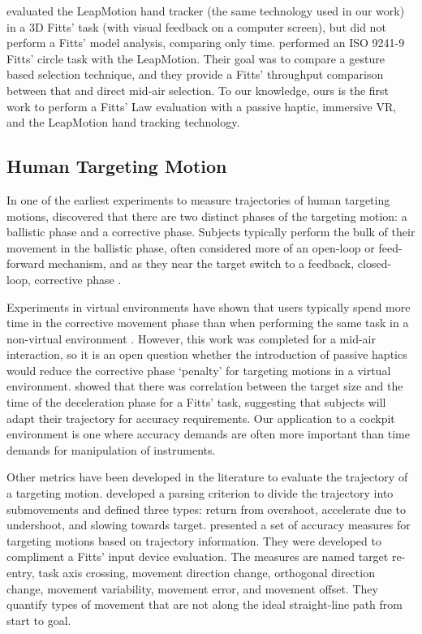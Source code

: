 \citet{coelho_pointing_2014} evaluated the LeapMotion hand tracker (the same technology used in our work) in a 3D Fitts' task (with visual feedback on a computer screen), but did not perform a Fitts' model analysis, comparing only time.
\citet{seixas_one_2015} performed an ISO 9241-9 Fitts' circle task with the LeapMotion.
Their goal was to compare a gesture based selection technique, and they provide a Fitts' throughput comparison between that and direct mid-air selection.
To our knowledge, ours is the first work to perform a Fitts' Law evaluation with a passive haptic, immersive VR, and the LeapMotion hand tracking technology.

\subsection{Human Targeting Motion}
\label{human-targeting-motion}

In one of the earliest experiments to measure trajectories of human targeting motions, \citet{woodworth_accuracy_1899} discovered that there are two distinct phases of the targeting motion: a ballistic phase and a corrective phase.
Subjects typically perform the bulk of their movement in the ballistic phase, often considered more of an open-loop or feed-forward mechanism, and as they near the target switch to a feedback, closed-loop, corrective phase \citep{elliott_control_1999}.

Experiments in virtual environments have shown that users typically spend more time in the corrective movement phase than when performing the same task in a non-virtual environment \citep{liu_comparing_2009}.
However, this work was completed for a mid-air interaction, so it is an open question whether the introduction of passive haptics would reduce the corrective phase `penalty' for targeting motions in a virtual environment.
\citet{mackenzie_three-dimensional_1987} showed that there was correlation between the target size and the time of the deceleration phase for a Fitts' task, suggesting that subjects will adapt their trajectory for accuracy requirements.
Our application to a cockpit environment is one where accuracy demands are often more important than time demands for manipulation of instruments.

Other metrics have been developed in the literature to evaluate the trajectory of a targeting motion.
\citet{meyer_optimality_1988} developed a parsing criterion to divide the trajectory into submovements and defined three types: return from overshoot, accelerate due to undershoot, and slowing towards target.
\citet{mackenzie_accuracy_2001} presented a set of accuracy measures for targeting motions based on trajectory information.
They were developed to compliment a Fitts' input device evaluation.
The measures are named target re-entry, task axis crossing, movement direction change, orthogonal direction change, movement variability, movement error, and movement offset.
They quantify types of movement that are not along the ideal straight-line path from start to goal.

